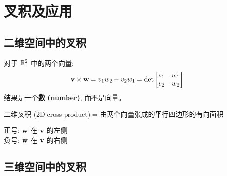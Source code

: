 
\chapter{叉积及应用}
\label{ch:crossproduct}

\begin{abstract}
叉积 (cross product, 又称向量积 vector product) 是一种运算, 它由三维空间中的两个向量生成一个同时垂直于这两个向量的向量。在本章中, 我们将学习它的定义、性质, 以及它与行列式之间的深刻联系。
\end{abstract}

\section{二维空间中的叉积}

\begin{definition}[二维叉积]
对于 $\mathbb{R}^2$ 中的两个向量:
\[
\mathbf{v} \times \mathbf{w} = v_1 w_2 - v_2 w_1 = \det\begin{bmatrix} v_1 & w_1 \\ v_2 & w_2 \end{bmatrix}
\]
结果是一个\textbf{数 (number)}, 而不是向量。
\end{definition}

\begin{intuition}
二维叉积 (2D cross product) = 由两个向量张成的平行四边形的有向面积

正号: $\mathbf{w}$ 在 $\mathbf{v}$ 的左侧\\
负号: $\mathbf{w}$ 在 $\mathbf{v}$ 的右侧
\end{intuition}

\begin{center}
\end{center}

\section{三维空间中的叉积}

